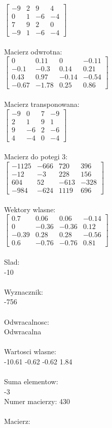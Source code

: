 \documentclass[a4paper,12pt]{article}
\begin{document}
$\begin{bmatrix} -9&2&9&4\\0&1&-6&-4\\7&9&2&0\\-9&1&-6&-4 \end{bmatrix}$
\\
\\
Macierz odwrotna:\\

$\begin{bmatrix} 0&0.11&0&-0.11\\-0.1&-0.3&0.14&0.21\\0.43&0.97&-0.14&-0.54\\-0.67&-1.78&0.25&0.86 \end{bmatrix}$
\\
\\
Macierz transponowana:\\

$\begin{bmatrix} -9&0&7&-9\\2&1&9&1\\9&-6&2&-6\\4&-4&0&-4 \end{bmatrix}$
\\
\\
Macierz do potegi 3:\\

$\begin{bmatrix} -1125&-666&720&396\\-12&-3&228&156\\604&52&-613&-328\\-984&-624&1119&696 \end{bmatrix}$
\\
\\
Wektory wlasne:\\

$\begin{bmatrix} 0.7&0.06&0.06&-0.14\\0&-0.36&-0.36&0.12\\-0.39&0.28&0.28&-0.56\\0.6&-0.76&-0.76&0.81 \end{bmatrix}$
\\
\\
Slad:\\
-10
\\
\\
Wyznacznik:\\
-756
\\
\\
Odwracalnosc:\\
Odwracalna
\\
\\
Wartosci wlasne:\\
-10.61 -0.62 -0.62 1.84
\\
\\
Suma elementow:\\
-3
\\
\newpage
Numer macierzy:
430
\\
\\
Macierz:\\
\end{document}
